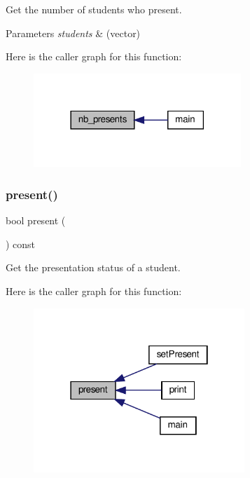 Get the number of students who present. 


\begin{DoxyParams}{Parameters}
{\em students} & (vector) \\
\hline
\end{DoxyParams}
Here is the caller graph for this function\+:
\nopagebreak
\begin{figure}[H]
\begin{center}
\leavevmode
\includegraphics[width=222pt]{classStudent_ac8e5bc83d3632e30a849bf0163350d7b_icgraph}
\end{center}
\end{figure}
\mbox{\label{classStudent_a110ce4aee2c3c5912933d8e8aa70cc1e}} 
\subsubsection{\texorpdfstring{present()}{present()}}
{\footnotesize\ttfamily bool present (\begin{DoxyParamCaption}{ }\end{DoxyParamCaption}) const}



Get the presentation status of a student. 

Here is the caller graph for this function\+:
\nopagebreak
\begin{figure}[H]
\begin{center}
\leavevmode
\includegraphics[width=226pt]{classStudent_a110ce4aee2c3c5912933d8e8aa70cc1e_icgraph}
\end{center}
\end{figure}
\mbox{\label{classStudent_acd848ed8bb05466e6d96bd387a8326c2}} 
